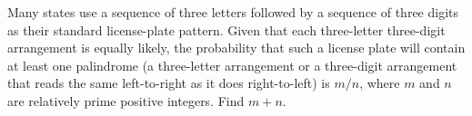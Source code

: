 Many states use a sequence of three letters followed by a sequence of three digits as their standard license-plate pattern.  Given that each three-letter three-digit arrangement is equally likely, the probability that such a license plate will contain at least one palindrome (a three-letter arrangement or a three-digit arrangement that reads the same left-to-right as it does right-to-left) is $m/n$, where $m$ and $n$ are relatively prime positive integers.  Find $m+n$.